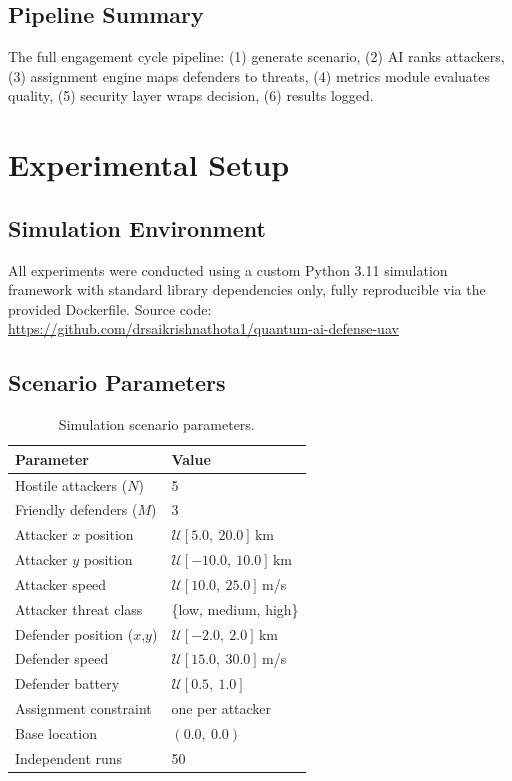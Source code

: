 \documentclass[12pt, a4paper]{article}
\begin{document}
\subsection{Pipeline Summary}

The full engagement cycle pipeline: (1) generate scenario, (2) AI ranks attackers, (3) assignment engine maps defenders to threats, (4) metrics module evaluates quality, (5) security layer wraps decision, (6) results logged.

\section{Experimental Setup}

\subsection{Simulation Environment}

All experiments were conducted using a custom Python 3.11 simulation framework with standard library dependencies only, fully reproducible via the provided Dockerfile. Source code: \url{https://github.com/drsaikrishnathota1/quantum-ai-defense-uav}

\subsection{Scenario Parameters}

\begin{table}[h]
\centering
\caption{Simulation scenario parameters.}
\label{tab:params}
\begin{tabular}{ll}
\toprule
\textbf{Parameter} & \textbf{Value} \\
\midrule
Hostile attackers ($N$)      & 5 \\
Friendly defenders ($M$)     & 3 \\
Attacker $x$ position        & $\mathcal{U}[5.0,\ 20.0]$\,km \\
Attacker $y$ position        & $\mathcal{U}[-10.0,\ 10.0]$\,km \\
Attacker speed               & $\mathcal{U}[10.0,\ 25.0]$\,m/s \\
Attacker threat class        & \{low, medium, high\} \\
Defender position ($x$,$y$)  & $\mathcal{U}[-2.0,\ 2.0]$\,km \\
Defender speed               & $\mathcal{U}[15.0,\ 30.0]$\,m/s \\
Defender battery             & $\mathcal{U}[0.5,\ 1.0]$ \\
Assignment constraint        & one per attacker \\
Base location                & $(0.0,\ 0.0)$ \\
Independent runs             & 50 \\
\bottomrule
\end{tabular}
\end{table}
\end{document}
